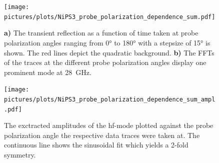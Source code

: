 \begin{figure}[hbt!]
    \centering
    \texttt{[image: pictures/plots/NiPS3\_probe\_polarization\_dependence\_sum.pdf]} \vspace{-0.3cm}
    \caption{\textbf{a)} The transient reflection as a function of time taken at probe polarization angles ranging from 0° to 180° with a stepsize of 15° is shown. The red lines depict the quadratic background. \textbf{b)} The FFTs of the traces at the different probe polarization angles display one prominent mode at \qty{28}{GHz}.}
    \label{fig:NiPS3_probe_polarization_dependence_sum}
\end{figure}
\begin{figure}[hbt!]
    \centering  
    \texttt{[image: pictures/plots/NiPS3\_probe\_polarization\_dependence\_sum\_ampl.pdf]} \vspace{-0.3cm}
    \caption{The exctracted amplitudes of the hf-mode plotted against the probe polarization angle the respective data traces were taken at. The continuous line shows the sinusoidal fit which yields a 2-fold symmetry.}
    \label{fig:NiPS3_probe_polarization_dependence_sum_ampl}
\end{figure}
\FloatBarrier

